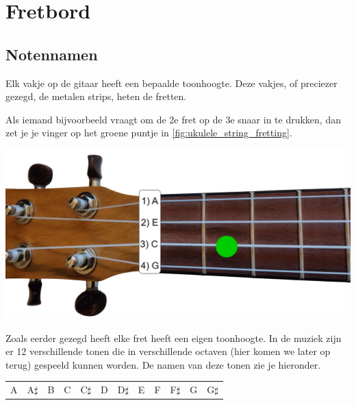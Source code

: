 \section{Fretbord}

\subsection{Notennamen}

\begin{minipage}[b]{0.48\textwidth}
Elk vakje op de gitaar heeft een bepaalde toonhoogte. Deze vakjes, of preciezer gezegd, de metalen strips, heten de fretten.

Als iemand bijvoorbeeld vraagt om de 2e fret op de 3e snaar in te drukken, dan zet je je vinger op het groene puntje in \ref{fig:ukulele_string_fretting}.
\end{minipage}
\hfill
\begin{minipage}{0.48\textwidth}
    \centering
    \includegraphics[width=\textwidth]{../Images/ukulele-neck-fretting.png}
    \label{fig:ukulele_string_fretting}
\end{minipage}

Zoals eerder gezegd heeft elke fret heeft een eigen toonhoogte. In de muziek zijn er 12 verschillende tonen die in verschillende octaven (hier komen we later op terug) gespeeld kunnen worden. De namen van deze tonen zie je hieronder.

\begin{table}[h]
\centering
\begin{tabular}{*{12}{P{5mm}}}
\large{A} & \large{A$\sharp$} & \large{B} & \large{C} & \large{C$\sharp$} & \large{D} & \large{D$\sharp$} & \large{E} & \large{F} & \large{F$\sharp$} & \large{G} & \large{G$\sharp$}
\end{tabular}
\end{table}

